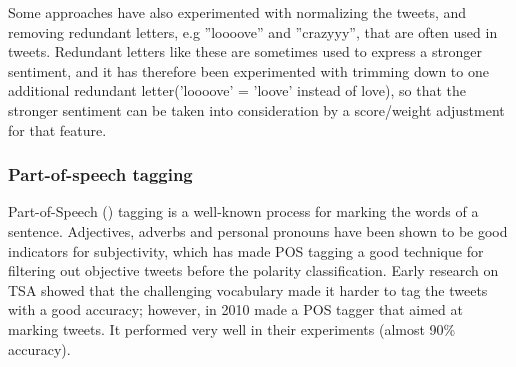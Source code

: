 Some approaches have also experimented with normalizing the tweets, and removing redundant letters, e.g ''loooove'' and ''crazyyy'', that are often used in tweets. Redundant letters like these are sometimes used to express a stronger sentiment, and it has therefore been experimented with trimming down to one additional redundant letter('loooove' = 'loove' instead of love), so that the stronger sentiment can be taken into consideration by a score/weight adjustment for that feature.

\subsubsection*{Part-of-speech tagging}
Part-of-Speech () tagging is a well-known process for marking the words of a sentence. Adjectives, adverbs and personal pronouns have been shown to be good indicators for subjectivity, which has made POS tagging a good technique for filtering out objective tweets before the polarity classification. Early research on TSA showed that the challenging vocabulary made it harder to tag the tweets with a good accuracy; however, in 2010 \cite{article:gimpel} made a POS tagger that aimed at marking tweets. It performed very well in their experiments (almost 90\% accuracy).
